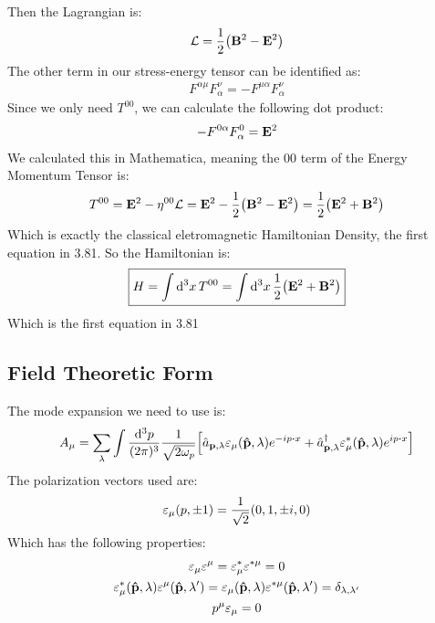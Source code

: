 \documentclass[12pt]{article}
\renewcommand{\L}{\mathcal{L}}
\newcommand{\veps}{\varepsilon}
\begin{document}
Then the Lagrangian is:
\begin{align*}
  \L=\frac12\qty(\vb{B}^2-\vb{E}^2)
\end{align*}
The other term in our stress-energy tensor can be identified as:
\begin{align*}
  F^{\alpha\mu}F^\nu_\alpha=-F^{\mu\alpha}F^\nu_\alpha
\end{align*}
Since we only need $T^{00}$, we can calculate the following dot product:
\begin{align*}
  -F^{0\alpha}F^0_\alpha=\vb{E}^2
\end{align*}
We calculated this in Mathematica, meaning the $00$ term of the Energy Momentum Tensor is:
\begin{align*}
  T^{00}=\vb{E}^2-\eta^{00}\L=\vb{E}^2-\frac12\qty(\vb{B}^2-\vb{E}^2)=
  \frac12\qty(\vb{E}^2+\vb{B}^2)
\end{align*}
Which is exactly the classical eletromagnetic Hamiltonian Density, the first equation in 3.81. So the Hamiltonian is:
\begin{align}
  \boxed{H=\int\dd[3]{x}T^{00}=\int\dd[3]{x}\frac12\qty(\vb{E}^2+\vb{B}^2)}
\end{align}
Which is the first equation in 3.81

\subsection{Field Theoretic Form}
The mode expansion we need to use is:
\begin{align*}
  A_\mu=\sum_\lambda\int\frac{\dd[3]{p}}{(2\pi)^3}\frac1{\sqrt{2\omega_p}}
  \qty[
  \hat{a}_{\vb{p},\lambda}\veps_\mu(\vu{p},\lambda)e^{-ip\vdot x}+
  \hat{a}^\dag_{\vb{p},\lambda}\veps^*_\mu(\vu{p},\lambda)e^{ip\vdot x}]
\end{align*}
The polarization vectors used are:
\begin{align*}
  \veps_\mu(p,\pm1)=\frac1{\sqrt{2}}\qty(0,1,\pm i,0)
\end{align*}
Which has the following properties:
\begin{gather*}
  \veps_\mu\veps^\mu=\veps^*_\mu\veps^{*\mu}=0\\
  \veps^*_\mu(\vu{p},\lambda)\veps^\mu(\vu{p},\lambda')
  =\veps_\mu(\vu{p},\lambda)\veps^{*\mu}(\vu{p},\lambda')=
  \delta_{\lambda,\lambda'}\\
  p^\mu\veps_\mu=0
\end{gather*}
\end{document}
